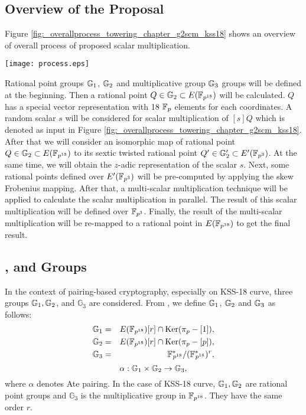 \subsection{Overview of the Proposal} 
Figure \ref{fig:_overallprocess_towering_chapter_g2scm_kss18} shows an overview of overall process of proposed scalar multiplication.
\begin{figure*}[ht]
	\centering
	\texttt{[image: process.eps]}
	\caption{Overview of the proposed scalar multiplication for KSS-18 curve.}
	\label{fig:_overallprocess_towering_chapter_g2scm_kss18}
\end{figure*}
Rational point groups ${\mathbb{G}}_{1}$, ${\mathbb{G}}_{2}$ and multiplicative group ${\mathbb{G}}_{3}$ groups will be defined at the beginning. Then a rational point $Q\in {\mathbb{G}}_{2} \subset E({\mathbb{F}}_{p^{18}})$ will be calculated.
$Q$ has a  special vector representation with 18 ${\mathbb{F}}_{p}$ elements for each coordinates. 
A random scalar $s$ will be considered for scalar multiplication of $[s]Q$ which is denoted as input in  Figure \ref{fig:_overallprocess_towering_chapter_g2scm_kss18}. After that we will consider an isomorphic map of rational point $Q\in {\mathbb{G}}_{2} \subset E({\mathbb{F}}_{p^{18}})$ to its sextic twisted rational point $Q' \in {\mathbb{G}}_{2}' \subset E'({\mathbb{F}}_{p^{3}})$. At the same time, we will obtain the $z$-adic representation of the scalar $s$. Next, some rational points defined over $E'(\mathbb{F}_{p^3})$ will be pre-computed by applying the skew Frobenius mapping. After that, a multi-scalar multiplication technique will be applied to calculate the scalar multiplication in parallel. The result of this scalar multiplication will be defined over $\mathbb{F}_{p^3}$. Finally, the result of the multi-scalar multiplication will be re-mapped to a rational point in $E(\mathbb{F}_{p^{18}})$ to get the final result.

\subsection{,  and  Groups} 
In the context of pairing-based cryptography, especially on KSS-18 curve, three groups ${\mathbb{G}}_{1}, {\mathbb{G}}_{2}$, and $\mathbb{G}_3$ are considered. From \cite{PAIRING:MANS13}, we define ${\mathbb{G}}_{1}$, ${\mathbb{G}}_{2}$ and ${\mathbb{G}}_{3}$ as follows:
\begin{eqnarray}\label{eq:g1_chapter_g2scm_kss18}
{\mathbb{G}}_{1} & = &  E({\mathbb{F}}_{p^{18}}) [r] \cap \text{Ker}(\pi_p - [1]), \nonumber \\
{\mathbb{G}}_{2} & = &  E({\mathbb{F}}_{p^{18}}) [r] \cap \text{Ker}(\pi_p - [p]), \nonumber \\
{\mathbb{G}}_{3} & = & {{\mathbb{F}}^{\ast}}_{\!\!\!p^{18}}/({{\mathbb{F}}^{\ast}}_{\!\!\!p^{18}})^r, \nonumber
\end{eqnarray}
\begin{equation}
\alpha : {\mathbb{G}}_{1} \times {\mathbb{G}}_{2} \rightarrow {\mathbb{G}}_{3},
\end{equation}
where $\alpha$ denotes Ate pairing. In the case of KSS-18 curve, ${\mathbb{G}}_{1}, {\mathbb{G}}_{2}$ are rational point groups and $\mathbb{G}_3$ is the multiplicative group in $\mathbb{F}_{p^{18}}$. They have the same order $r$. 

